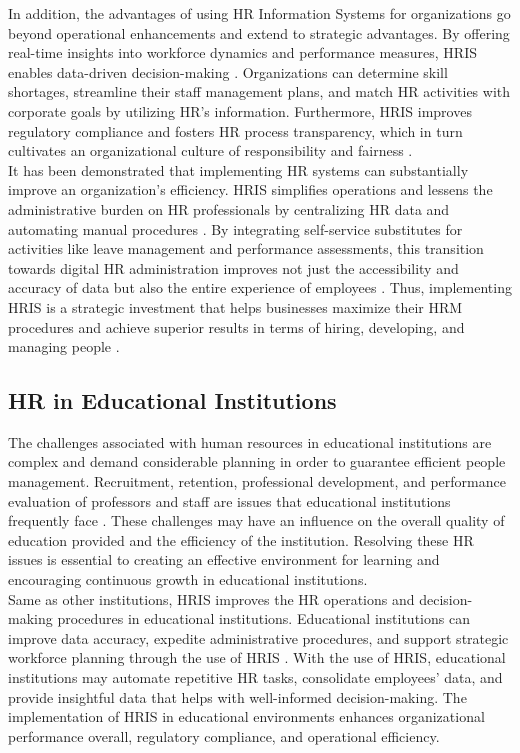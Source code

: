         In addition, the advantages of using HR Information Systems for organizations go beyond operational enhancements and extend to strategic advantages. By offering real-time insights into workforce dynamics and performance measures, HRIS enables data-driven decision-making \cite{hae12021}. Organizations can determine skill shortages, streamline their staff management plans, and match HR activities with corporate goals by utilizing HR's information. Furthermore, HRIS improves regulatory compliance and fosters HR process transparency, which in turn cultivates an organizational culture of responsibility and fairness \cite{pfsa12023}.
        \\
        
        It has been demonstrated that implementing HR systems can substantially improve an organization's efficiency. HRIS simplifies operations and lessens the administrative burden on HR professionals by centralizing HR data and automating manual procedures \cite{arc12020}. By integrating self-service substitutes for activities like leave management and performance assessments, this transition towards digital HR administration improves not just the accessibility and accuracy of data but also the entire experience of employees \cite{f12022}. Thus, implementing HRIS is a strategic investment that helps businesses maximize their HRM procedures and achieve superior results in terms of hiring, developing, and managing people \cite{aab12019}.
        

    \subsection{HR in Educational Institutions}
        The challenges associated with human resources in educational institutions are complex and demand considerable planning in order to guarantee efficient people management. Recruitment, retention, professional development, and performance evaluation of professors and staff are issues that educational institutions frequently face \cite{f12023}. These challenges may have an influence on the overall quality of education provided and the efficiency of the institution. Resolving these HR issues is essential to creating an effective environment for learning and encouraging continuous growth in educational institutions.
        \\
        
    	Same as other institutions, HRIS improves the HR operations and decision-making procedures in educational institutions. Educational institutions can improve data accuracy, expedite administrative procedures, and support strategic workforce planning through the use of HRIS \cite{edcpr12019}. With the use of HRIS, educational institutions may automate repetitive HR tasks, consolidate employees' data, and provide insightful data that helps with well-informed decision-making. The implementation of HRIS in educational environments enhances organizational performance overall, regulatory compliance, and operational efficiency.
        \\

